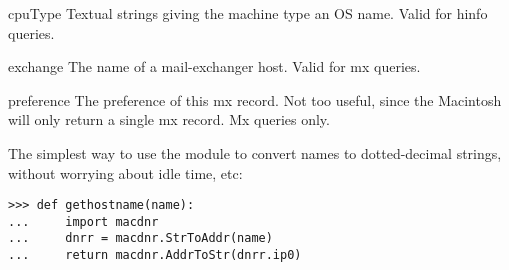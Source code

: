 \begin{datadesc}{cpuType}
Textual strings giving the machine type an OS name.  Valid for hinfo
queries.
\end{datadesc}

\begin{datadesc}{exchange}
The name of a mail-exchanger host.  Valid for mx queries.
\end{datadesc}

\begin{datadesc}{preference}
The preference of this mx record.  Not too useful, since the Macintosh
will only return a single mx record.  Mx queries only.
\end{datadesc}

The simplest way to use the module to convert names to dotted-decimal
strings, without worrying about idle time, etc:
\begin{verbatim}
>>> def gethostname(name):
...     import macdnr
...     dnrr = macdnr.StrToAddr(name)
...     return macdnr.AddrToStr(dnrr.ip0)
\end{verbatim}
